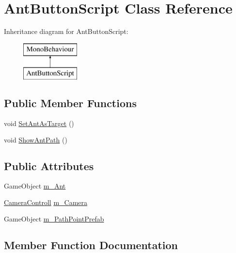 \hypertarget{class_ant_button_script}{}\section{Ant\+Button\+Script Class Reference}
\label{class_ant_button_script}
Inheritance diagram for Ant\+Button\+Script\+:\begin{figure}[H]
\begin{center}
\leavevmode
\includegraphics[height=2.000000cm]{class_ant_button_script}
\end{center}
\end{figure}
\subsection*{Public Member Functions}
\begin{DoxyCompactItemize}
\item 
void \mbox{\hyperlink{class_ant_button_script_a610f27a4939b002e578652f32ddf6364}{Set\+Ant\+As\+Target}} ()
\item 
void \mbox{\hyperlink{class_ant_button_script_a029d9e33c7cb613ab43080966be99109}{Show\+Ant\+Path}} ()
\end{DoxyCompactItemize}
\subsection*{Public Attributes}
\begin{DoxyCompactItemize}
\item 
Game\+Object \mbox{\hyperlink{class_ant_button_script_a57fa1a06d07ebcd541723078286bbadf}{m\+\_\+\+Ant}}
\item 
\mbox{\hyperlink{class_camera_controll}{Camera\+Controll}} \mbox{\hyperlink{class_ant_button_script_a6b175c048310e33ac569582d58a46429}{m\+\_\+\+Camera}}
\item 
Game\+Object \mbox{\hyperlink{class_ant_button_script_a74cf7ea28e9aef6e698f3eecf79b56bc}{m\+\_\+\+Path\+Point\+Prefab}}
\end{DoxyCompactItemize}


\subsection{Member Function Documentation}
\mbox{\label{class_ant_button_script_a610f27a4939b002e578652f32ddf6364}} 
